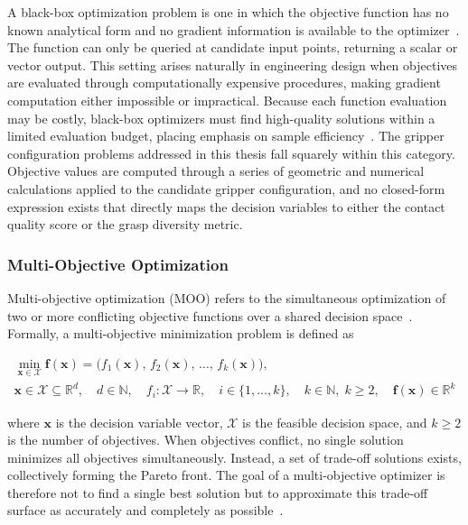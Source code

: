 A black-box optimization problem is one in which the objective function has no known analytical form and no gradient information is available to the
optimizer~\cite{Audet2017Derivative-Free}. The function can only be queried at candidate input points, returning a scalar or vector output. This
setting arises naturally in engineering design when objectives are evaluated through computationally expensive procedures, making gradient computation
either impossible or impractical. Because each function evaluation may be costly, black-box optimizers must find high-quality solutions within a
limited evaluation budget, placing emphasis on sample efficiency~\cite{Jones2022Constrained}.
The gripper configuration problems addressed in this thesis fall squarely within this category. Objective values are computed through a series of
geometric and numerical calculations applied to the candidate gripper configuration, and no closed-form expression exists that directly maps the
decision variables to either the contact quality score or the grasp diversity metric.

\subsubsection{Multi-Objective Optimization}
\label{subsubsec:multi_objective_optimization}

Multi-objective optimization (MOO) refers to the simultaneous optimization of two or more conflicting objective functions over a shared decision
space~\cite{Deb2011Multi-objective}. Formally, a multi-objective minimization problem is defined as

\begin{equation}
    \begin{gathered}
        \min_{\mathbf{x} \in \mathcal{X}} \mathbf{f}(\mathbf{x}) =
        \bigl(f_1(\mathbf{x}),\, f_2(\mathbf{x}),\, \ldots,\, f_k(\mathbf{x})\bigr), \\[4pt]
        \mathbf{x} \in \mathcal{X} \subseteq \mathbb{R}^{d},\quad
        d \in \mathbb{N},\quad
        f_i : \mathcal{X} \rightarrow \mathbb{R},\quad
        i \in \{1,\ldots,k\},\quad
        k \in \mathbb{N},\; k \geq 2,\quad
        \mathbf{f}(\mathbf{x}) \in \mathbb{R}^{k}
    \end{gathered}
\end{equation}

where $\mathbf{x}$ is the decision variable vector, $\mathcal{X}$ is the feasible decision space, and $k \geq 2$ is the number of objectives. When
objectives conflict, no single solution minimizes all objectives simultaneously. Instead, a set of trade-off solutions exists, collectively forming
the Pareto front. The goal of a multi-objective optimizer is therefore not to find a single best solution but to approximate this trade-off surface as
accurately and completely as possible~\cite{Deb2011Multi-objective,Gunantara2018A}.

